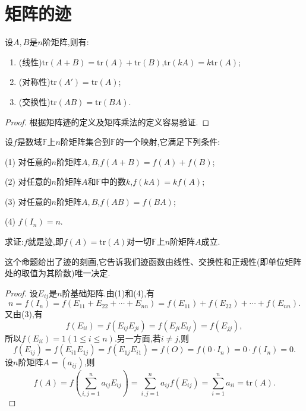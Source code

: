 \documentclass[../../main.tex]{subfiles}
\begin{document}
\section{矩阵的迹}

\begin{proposition}[矩阵迹的性质]\label{proposition:矩阵矩阵迹的性质}
设\(A,B\)是\(n\)阶矩阵,则有:
\begin{enumerate}
\item (线性)\(\mathrm{tr}(A + B)=\mathrm{tr}(A)+\mathrm{tr}(B)\),\(\mathrm{tr}(kA)=k\mathrm{tr}(A)\);
\item (对称性)\(\mathrm{tr}(A')=\mathrm{tr}(A)\);
\item (交换性)\(\mathrm{tr}(AB)=\mathrm{tr}(BA)\).
\end{enumerate}
\end{proposition}
\begin{proof}
根据矩阵迹的定义及矩阵乘法的定义容易验证.
\end{proof}

\begin{proposition}[矩阵迹的刻画]\label{proposition:矩阵迹的刻画}
设\(f\)是数域\(\mathbb{F}\)上\(n\)阶矩阵集合到\(\mathbb{F}\)的一个映射,它满足下列条件:

(1) 对任意的\(n\)阶矩阵\(A,B\),\(f(A + B)=f(A)+f(B)\);

(2) 对任意的\(n\)阶矩阵\(A\)和\(\mathbb{F}\)中的数\(k\),\(f(kA)=kf(A)\);

(3) 对任意的\(n\)阶矩阵\(A,B\),\(f(AB)=f(BA)\);

(4) \(f(I_n)=n\).

求证:\(f\)就是迹,即\(f(A)=\mathrm{tr}(A)\)对一切\(\mathbb{F}\)上\(n\)阶矩阵\(A\)成立.
\end{proposition}
\begin{note}
这个命题给出了迹的刻画,它告诉我们迹函数由线性、交换性和正规性(即单位矩阵处的取值为其阶数)唯一决定.
\end{note}
\begin{proof}
设\(E_{ij}\)是\(n\)阶基础矩阵.由(1)和(4),有
\[
n = f(I_n)=f(E_{11}+E_{22}+\cdots+E_{nn})=f(E_{11})+f(E_{22})+\cdots+f(E_{nn}).
\]
又由(3),有
\[
f(E_{ii})=f(E_{ij}E_{ji})=f(E_{ji}E_{ij})=f(E_{jj}),
\]
所以\(f(E_{ii}) = 1(1\leq i\leq n)\).另一方面,若\(i\neq j\),则
\[
f(E_{ij})=f(E_{i1}E_{1j})=f(E_{1j}E_{i1})=f(O)=f(0\cdot I_n)=0\cdot f(I_n)=0.
\]
设\(n\)阶矩阵\(A=(a_{ij})\),则
\[
f(A)=f\left(\sum_{i,j = 1}^{n}a_{ij}E_{ij}\right)=\sum_{i,j = 1}^{n}a_{ij}f(E_{ij})=\sum_{i = 1}^{n}a_{ii}=\mathrm{tr}(A).
\]
\end{proof}
\end{document}
